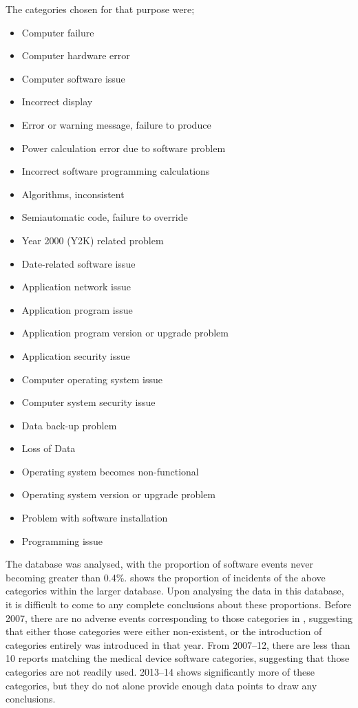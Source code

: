 \documentclass{cshonours}
\begin{document}
{The categories chosen for that purpose were;
\begin{itemize}
  \item Computer failure
  \item Computer hardware error
  \item Computer software issue
  \item Incorrect display
  \item Error or warning message, failure to produce
  \item Power calculation error due to software problem
  \item Incorrect software programming calculations
  \item Algorithms, inconsistent
  \item Semiautomatic code, failure to override
  \item Year 2000 (Y2K) related problem
  \item Date-related software issue
  \item Application network issue
  \item Application program issue
  \item Application program version or upgrade problem
  \item Application security issue
  \item Computer operating system issue
  \item Computer system security issue
  \item Data back-up problem
  \item Loss of Data
  \item Operating system becomes non-functional
  \item Operating system version or upgrade problem
  \item Problem with software installation
  \item Programming issue
\end{itemize}

The database was analysed, with the proportion of software events never becoming greater than 0.4\%.  shows the proportion of incidents of the above categories within the larger database. Upon analysing the data in this database, it is difficult to come to any complete conclusions about these proportions. Before 2007, there are no adverse events corresponding to those categories in \maude, suggesting that either those categories were either non-existent, or the introduction of categories entirely was introduced in that year. From 2007--12, there are less than 10 reports matching the medical device software categories, suggesting that those categories are not readily used. 2013--14 shows significantly more of these categories, but they do not alone provide enough data points to draw any conclusions.

}
\end{document}

